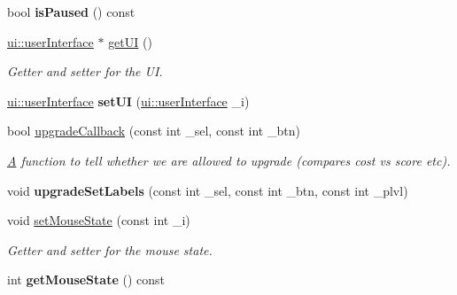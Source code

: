 \begin{DoxyCompactItemize}
\item 
\hypertarget{classuniverse_ad5cc400800e499f80e1e7722515bc216}{bool {\bfseries is\-Paused} () const }\label{classuniverse_ad5cc400800e499f80e1e7722515bc216}

\item 
\hypertarget{classuniverse_a65fe9d463d02b0fbed6e1dc28b6657cb}{\hyperlink{classui_1_1user_interface}{ui\-::user\-Interface} $\ast$ \hyperlink{classuniverse_a65fe9d463d02b0fbed6e1dc28b6657cb}{get\-U\-I} ()}\label{classuniverse_a65fe9d463d02b0fbed6e1dc28b6657cb}

\begin{DoxyCompactList}\small\item\em Getter and setter for the U\-I. \end{DoxyCompactList}\item 
\hypertarget{classuniverse_a78ad78159c1e509f091cd0fac62a5fc1}{\hyperlink{classui_1_1user_interface}{ui\-::user\-Interface} {\bfseries set\-U\-I} (\hyperlink{classui_1_1user_interface}{ui\-::user\-Interface} \-\_\-i)}\label{classuniverse_a78ad78159c1e509f091cd0fac62a5fc1}

\item 
bool \hyperlink{classuniverse_a09a2c776eb45b5667e096ff9881c5e77}{upgrade\-Callback} (const int \-\_\-sel, const int \-\_\-btn)
\begin{DoxyCompactList}\small\item\em \hyperlink{struct_a}{A} function to tell whether we are allowed to upgrade (compares cost vs score etc). \end{DoxyCompactList}\item 
\hypertarget{classuniverse_a1c7652330bd49d9f01e9ab32f89d90c9}{void {\bfseries upgrade\-Set\-Labels} (const int \-\_\-sel, const int \-\_\-btn, const int \-\_\-plvl)}\label{classuniverse_a1c7652330bd49d9f01e9ab32f89d90c9}

\item 
\hypertarget{classuniverse_ab2890c3b19620f5bbefbb31fce0774d7}{void \hyperlink{classuniverse_ab2890c3b19620f5bbefbb31fce0774d7}{set\-Mouse\-State} (const int \-\_\-i)}\label{classuniverse_ab2890c3b19620f5bbefbb31fce0774d7}

\begin{DoxyCompactList}\small\item\em Getter and setter for the mouse state. \end{DoxyCompactList}\item 
\hypertarget{classuniverse_a1c4472798eb406c841e46015d1ef418a}{int {\bfseries get\-Mouse\-State} () const }\label{classuniverse_a1c4472798eb406c841e46015d1ef418a}


\end{DoxyCompactItemize}
